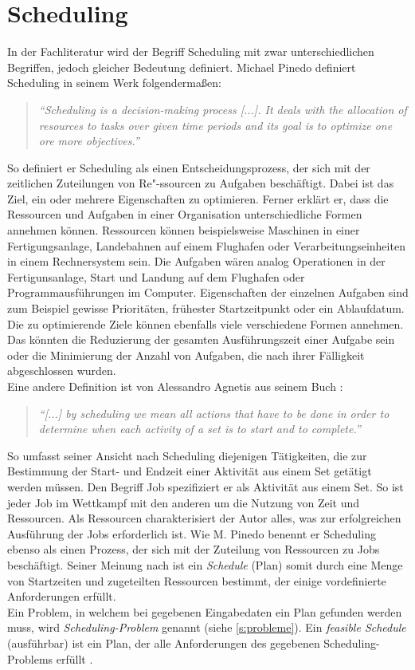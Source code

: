 \section{Scheduling}\label{s:scheduling}
In der Fachliteratur wird der Begriff Scheduling mit zwar unterschiedlichen Begriffen, jedoch gleicher Bedeutung definiert. Michael Pinedo definiert Scheduling in seinem Werk \cite{mpinedo} folgendermaßen:
\begin{quote}
\textit{"`Scheduling is a decision-making process [...]. It deals with the allocation of resources to tasks over given time periods and its goal is to optimize one ore more objectives."'}
\end{quote}
So definiert er Scheduling als einen Entscheidungsprozess, der sich mit der zeitlichen Zuteilungen von Re"-ssourcen zu Aufgaben beschäftigt. Dabei ist das Ziel, ein oder mehrere Eigenschaften zu optimieren. Ferner erklärt er, dass die Ressourcen und Aufgaben in einer Organisation unterschiedliche Formen annehmen können. Ressourcen können beispielsweise Maschinen in einer Fertigungsanlage, Landebahnen auf einem Flughafen oder Verarbeitungseinheiten in einem Rechnersystem sein. Die Aufgaben wären analog Operationen in der Fertigunsanlage, Start und Landung auf dem Flughafen oder Programmausführungen im Computer. Eigenschaften der einzelnen Aufgaben sind zum Beispiel gewisse Prioritäten, frühester Startzeitpunkt oder ein Ablaufdatum. Die zu optimierende Ziele können ebenfalls viele verschiedene Formen annehmen. Das könnten die Reduzierung der gesamten Ausführungszeit einer Aufgabe sein oder die Minimierung der Anzahl von Aufgaben, die nach ihrer Fälligkeit abgeschlossen wurden.\\

Eine andere Definition ist von Alessandro Agnetis aus seinem Buch \cite{aagnetis}:
\begin{quote}
\textit{"`[...] by scheduling we mean all actions that have to be done in order to determine when each activity of a set is to start and to complete."'}
\end{quote}
So umfasst seiner Ansicht nach Scheduling diejenigen Tätigkeiten, die zur Bestimmung der Start- und Endzeit einer Aktivität aus einem Set getätigt werden müssen. Den Begriff Job spezifiziert er als Aktivität aus einem Set. So ist jeder Job im Wettkampf mit den anderen um die Nutzung von Zeit und Ressourcen. Als Ressourcen charakterisiert der Autor alles, was zur erfolgreichen Ausführung der Jobs erforderlich ist. Wie M. Pinedo benennt er Scheduling ebenso als einen Prozess, der sich mit der Zuteilung von Ressourcen zu Jobs beschäftigt. Seiner Meinung nach ist ein \textit{Schedule} (Plan) somit durch eine Menge von Startzeiten und zugeteilten Ressourcen bestimmt, der einige vordefinierte Anforderungen erfüllt.\\
Ein Problem, in welchem bei gegebenen Eingabedaten ein Plan gefunden werden muss, wird \textit{Scheduling-Problem} genannt (siehe \ref{s:probleme}). Ein \textit{feasible Schedule} (ausführbar) ist ein Plan, der alle Anforderungen des gegebenen Scheduling-Problems erfüllt \cite{aagnetis}.\\

